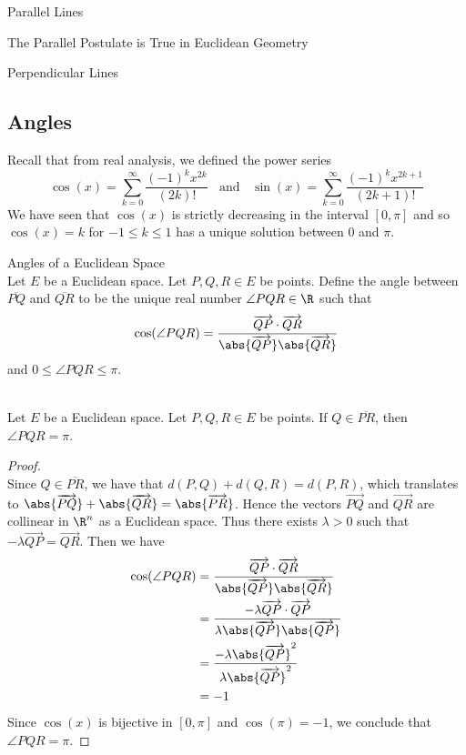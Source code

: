 \documentclass[a4paper]{article}
\begin{document}
\begin{defn}{Parallel Lines}{}
\end{defn}

\begin{prp}{The Parallel Postulate is True in Euclidean Geometry}{}
\end{prp}

\begin{defn}{Perpendicular Lines}{}
\end{defn}

\subsection{Angles}
Recall that from real analysis, we defined the power series $$\cos(x)=\sum_{k=0}^\infty\frac{(-1)^kx^{2k}}{(2k)!}\;\;\text{ and }\;\;\sin(x)=\sum_{k=0}^\infty\frac{(-1)^kx^{2k+1}}{(2k+1)!}$$ We have seen that $\cos(x)$ is strictly decreasing in the interval $[0,\pi]$ and so $\cos(x)=k$ for $-1\leq k\leq 1$ has a unique solution between $0$ and $\pi$. 

\begin{defn}{Angles of a Euclidean Space}{}\\
Let $E$ be a Euclidean space. Let $P,Q,R\in E$ be points. Define the angle between $\overline{PQ}$ and $\overline{QR}$ to be the unique real number $\angle PQR\in\R$ such that $$\cos(\angle PQR)=\frac{\overrightarrow{QP}\cdot\overrightarrow{QR}}{\abs{\overrightarrow{QP}}\abs{\overrightarrow{QR}}}$$ and $0\leq\angle PQR\leq\pi$. 
\end{defn}

\begin{lmm}{}{}\\
Let $E$ be a Euclidean space. Let $P,Q,R\in E$ be points. If $Q\in\overline{PR}$, then $\angle PQR=\pi$. 
\begin{proof}\\
Since $Q\in\overline{PR}$, we have that $d(P,Q)+d(Q,R)=d(P,R)$, which translates to $\abs{\overrightarrow{PQ}}+\abs{\overrightarrow{QR}}=\abs{\overrightarrow{PR}}$. Hence the vectors $\overrightarrow{PQ}$ and $\overrightarrow{QR}$ are collinear in $\R^n$ as a Euclidean space. Thus there exists $\lambda>0$ such that $-\lambda\overrightarrow{QP}=\overrightarrow{QR}$. Then we have 
\begin{align*}
\cos(\angle PQR)&=\frac{\overrightarrow{QP}\cdot\overrightarrow{QR}}{\abs{\overrightarrow{QP}}\abs{\overrightarrow{QR}}}\\
&=\frac{-\lambda\overrightarrow{QP}\cdot\overrightarrow{QP}}{\lambda\abs{\overrightarrow{QP}}\abs{\overrightarrow{QP}}}\\
&=\frac{-\lambda\abs{\overrightarrow{QP}}^2}{\lambda\abs{\overrightarrow{QP}}^2}\\
&=-1
\end{align*}
Since $\cos(x)$ is bijective in $[0,\pi]$ and $\cos(\pi)=-1$, we conclude that $\angle PQR=\pi$. 
\end{proof}
\end{lmm}
\end{document}
